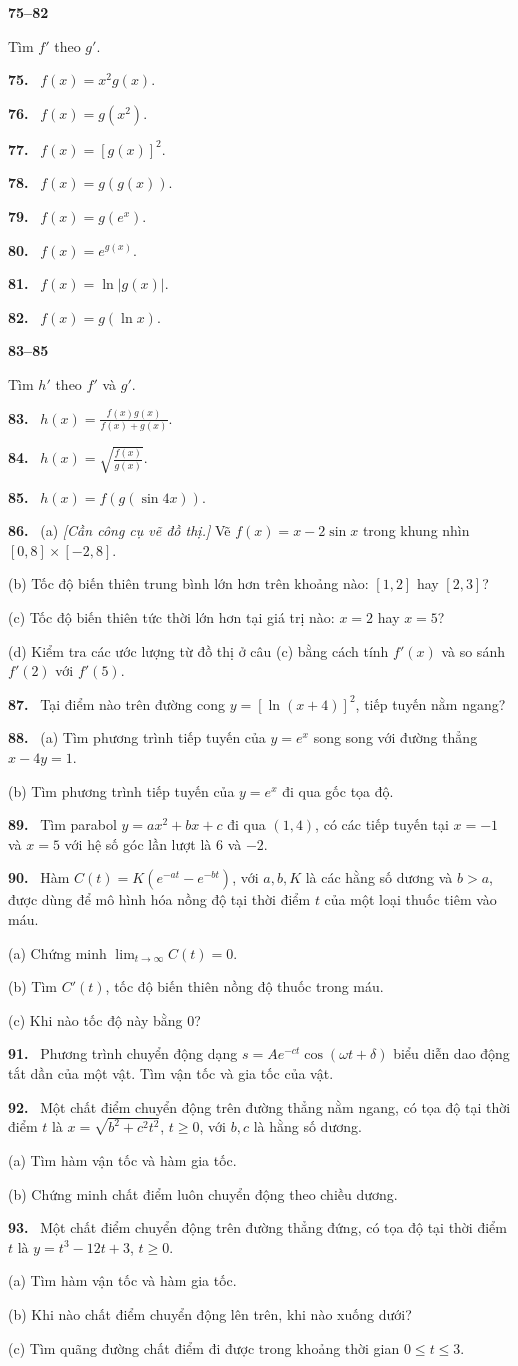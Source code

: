 \documentclass[12pt,a4paper]{article}
\newcommand{\bt}[1]{\par\smallskip\Needspace{5\baselineskip}\noindent\textbf{#1.}\ }
\newcommand{\group}[1]{\par\medskip\noindent\textbf{#1}\par\nopagebreak[4]}
\begin{document}
\group{75–82} Tìm $f'$ theo $g'$.
\bt{75} $f(x)=x^2g(x)$.
\bt{76} $f(x)=g(x^2)$.
\bt{77} $f(x)=[g(x)]^2$.
\bt{78} $f(x)=g(g(x))$.
\bt{79} $f(x)=g(e^x)$.
\bt{80} $f(x)=e^{g(x)}$.
\bt{81} $f(x)=\ln|g(x)|$.
\bt{82} $f(x)=g(\ln x)$.
\group{83–85} Tìm $h'$ theo $f'$ và $g'$.
\bt{83} $\displaystyle h(x)=\frac{f(x)g(x)}{f(x)+g(x)}$.
\bt{84} $\displaystyle h(x)=\sqrt{\frac{f(x)}{g(x)}}$.
\bt{85} $h(x)=f(g(\sin4x))$.
\bt{86} (a) \textit{[Cần công cụ vẽ đồ thị.]} Vẽ $f(x)=x-2\sin x$ trong khung nhìn $[0,8]\times[-2,8]$.

(b) Tốc độ biến thiên trung bình lớn hơn trên khoảng nào: $[1,2]$ hay $[2,3]$?

(c) Tốc độ biến thiên tức thời lớn hơn tại giá trị nào: $x=2$ hay $x=5$?

(d) Kiểm tra các ước lượng từ đồ thị ở câu (c) bằng cách tính $f'(x)$ và so sánh $f'(2)$ với $f'(5)$.
\bt{87} Tại điểm nào trên đường cong $y=[\ln(x+4)]^2$, tiếp tuyến nằm ngang?
\bt{88} (a) Tìm phương trình tiếp tuyến của $y=e^x$ song song với đường thẳng $x-4y=1$.

(b) Tìm phương trình tiếp tuyến của $y=e^x$ đi qua gốc tọa độ.
\bt{89} Tìm parabol $y=ax^2+bx+c$ đi qua $(1,4)$, có các tiếp tuyến tại $x=-1$ và $x=5$ với hệ số góc lần lượt là $6$ và $-2$.
\bt{90} Hàm $C(t)=K(e^{-at}-e^{-bt})$, với $a,b,K$ là các hằng số dương và $b>a$, được dùng để mô hình hóa nồng độ tại thời điểm $t$ của một loại thuốc tiêm vào máu.

(a) Chứng minh $\displaystyle\lim_{t\to\infty}C(t)=0$.

(b) Tìm $C'(t)$, tốc độ biến thiên nồng độ thuốc trong máu.

(c) Khi nào tốc độ này bằng $0$?
\bt{91} Phương trình chuyển động dạng $s=Ae^{-ct}\cos(\omega t+\delta)$ biểu diễn dao động tắt dần của một vật. Tìm vận tốc và gia tốc của vật.
\bt{92} Một chất điểm chuyển động trên đường thẳng nằm ngang, có tọa độ tại thời điểm $t$ là $x=\sqrt{b^2+c^2t^2}$, $t\ge0$, với $b,c$ là hằng số dương.

(a) Tìm hàm vận tốc và hàm gia tốc.

(b) Chứng minh chất điểm luôn chuyển động theo chiều dương.
\bt{93} Một chất điểm chuyển động trên đường thẳng đứng, có tọa độ tại thời điểm $t$ là $y=t^3-12t+3$, $t\ge0$.

(a) Tìm hàm vận tốc và hàm gia tốc.

(b) Khi nào chất điểm chuyển động lên trên, khi nào xuống dưới?

(c) Tìm quãng đường chất điểm đi được trong khoảng thời gian $0\le t\le3$.
\end{document}

